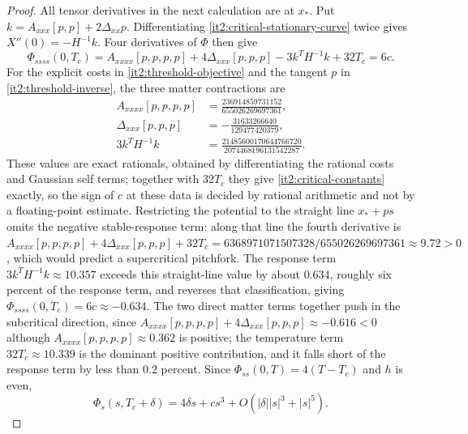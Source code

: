 \begin{proof}
All tensor derivatives in the next calculation are at $x_*$. Put $k=A_{xxx}[p,p]+2\Delta_{xx}p$. Differentiating \cref{it2:critical-stationary-curve} twice gives $X''(0)=-H^{-1}k$. Four derivatives of $\Phi$ then give
\begin{equation}
 \Phi_{ssss}(0,T_c)
 =A_{xxxx}[p,p,p,p]+4\Delta_{xxx}[p,p,p]-3k^TH^{-1}k+32T_c=6c.
 \label{it2:critical-quartic}
\end{equation}
For the explicit costs in \cref{it2:threshold-objective} and the tangent $p$ in \cref{it2:threshold-inverse}, the three matter contractions are
\begin{equation}
 \begin{aligned}
 A_{xxxx}[p,p,p,p]&=\frac{236914859731152}{655026269697361},\\
 \Delta_{xxx}[p,p,p]&=-\frac{31633266640}{129477420379},\\
 3k^TH^{-1}k&=\frac{21485600170644766720}{2074468196131542287}.
 \end{aligned}
 \label{it2:critical-contractions}
\end{equation}
These values are exact rationals, obtained by differentiating the rational costs and Gaussian self terms; together with $32T_c$ they give \cref{it2:critical-constants} exactly, so the sign of $c$ at these data is decided by rational arithmetic and not by a floating-point estimate.
Restricting the potential to the straight line $x_*+ps$ omits the negative stable-response term: along that line the fourth derivative is $A_{xxxx}[p,p,p,p]+4\Delta_{xxx}[p,p,p]+32T_c=6368971071507328/655026269697361\approx9.72>0$, which would predict a supercritical pitchfork. The response term $3k^TH^{-1}k\approx10.357$ exceeds this straight-line value by about $0.634$, roughly six percent of the response term, and reverses that classification, giving $\Phi_{ssss}(0,T_c)=6c\approx-0.634$. The two direct matter terms together push in the subcritical direction, since $A_{xxxx}[p,p,p,p]+4\Delta_{xxx}[p,p,p]\approx-0.616<0$ although $A_{xxxx}[p,p,p,p]\approx0.362$ is positive; the temperature term $32T_c\approx10.339$ is the dominant positive contribution, and it falls short of the response term by less than $0.2$ percent. Since $\Phi_{ss}(0,T)=4(T-T_c)$ and $h$ is even,
\begin{equation}
 \Phi_s(s,T_c+\delta)=4\delta s+c s^3+O(|\delta||s|^3+|s|^5).
 \label{it2:critical-stationary-force}
\end{equation}


\end{proof}
